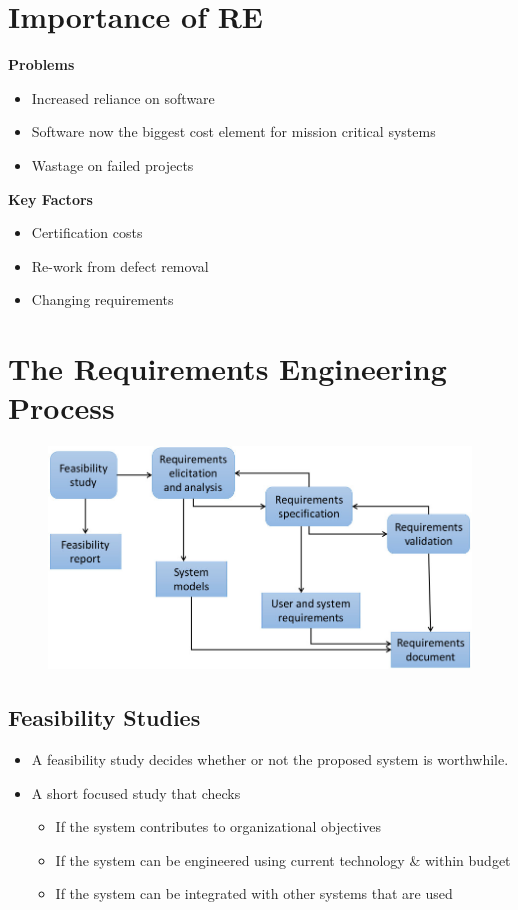 \documentclass{report}
\begin{document}
\section{Importance of RE}
\textbf{Problems}
\begin{itemize}
  \item Increased reliance on software
  \item Software now the biggest cost element for mission critical systems
  \item Wastage on failed projects
\end{itemize}
\textbf{Key Factors}
\begin{itemize}
  \item Certification costs
  \item Re-work from defect removal
  \item Changing requirements
\end{itemize}

\section{The Requirements Engineering Process}
\begin{figure}[H]
\centering
\includegraphics[scale=.45,trim=1cm 1cm 1cm 1cm]{assets/CEN4010_RE_Process.jpg}
\end{figure}

\subsection{Feasibility Studies}
\begin{itemize}
  \item A feasibility study decides whether or not the proposed
system is worthwhile.
  \item A short focused study that checks
  \begin{itemize}
    \item If the system contributes to organizational objectives
    \item If the system can be engineered using current technology \& within budget
    \item If the system can be integrated with other systems that are used
  \end{itemize}
\end{itemize}
\end{document}
